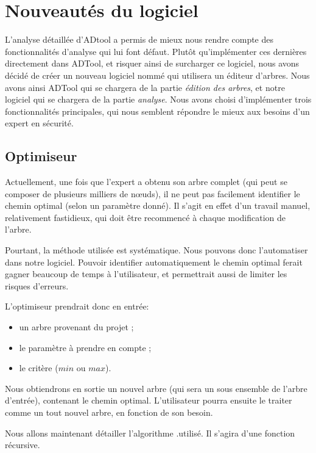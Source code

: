 \section{Nouveautés du logiciel}

	L'analyse détaillée d'ADtool a permis de mieux nous rendre compte des fonctionnalités d'analyse qui lui font défaut. Plutôt qu'implémenter ces dernières directement dans ADTool, et risquer ainsi de surcharger %
	ce logiciel, nous avons décidé de créer un nouveau logiciel nommé \glasir qui utilisera un éditeur d'arbres. Nous avons ainsi ADTool qui se chargera de la partie \textit{édition des arbres}, et notre logiciel qui se chargera de la partie \textit{analyse}. Nous avons choisi d'implémenter trois fonctionnalités principales, qui nous semblent répondre le mieux aux besoins d'un expert en sécurité.

		\subsection{Optimiseur}
		\label{subsection:optimiseur} 
		Actuellement, une fois que l'expert a obtenu son arbre complet (qui peut se composer de plusieurs milliers de nœuds), il ne peut pas facilement identifier le chemin optimal (selon un paramètre donné).
		Il s'agit en effet d'un travail manuel, relativement fastidieux, qui doit être recommencé à chaque modification de l'arbre.
		
		Pourtant, la méthode utilisée est systématique. Nous pouvons donc l'automatiser dans notre logiciel. Pouvoir identifier automatiquement le chemin optimal ferait gagner beaucoup de temps à l'utilisateur, et permettrait aussi de limiter les risques d'erreurs.
		
		L'optimiseur prendrait donc en entrée:
		\begin{itemize}
			\item un arbre provenant du projet ;
			\item le paramètre à prendre en compte ;
			\item le critère ($min$ ou $max$).
		\end{itemize}
		
		Nous obtiendrons en sortie un nouvel arbre (qui sera un sous ensemble de l'arbre d'entrée), contenant le chemin optimal. 
		L'utilisateur pourra ensuite le traiter comme un tout nouvel arbre, en fonction de son besoin.
		
		Nous allons maintenant détailler l'algorithme %
		.utilisé. Il s'agira d'une fonction récursive.

